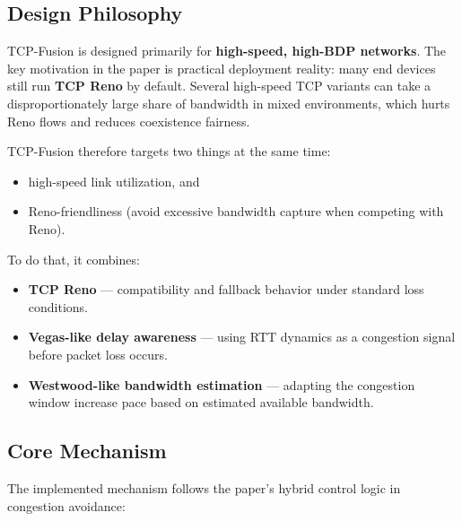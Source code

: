 \documentclass[12pt,a4paper]{article}
\begin{document}
\subsection{Design Philosophy}

TCP-Fusion is designed primarily for \textbf{high-speed, high-BDP networks}. The key motivation in the paper is practical deployment reality: many end devices still run \textbf{TCP Reno} by default. Several high-speed TCP variants can take a disproportionately large share of bandwidth in mixed environments, which hurts Reno flows and reduces coexistence fairness.

TCP-Fusion therefore targets two things at the same time:
\begin{itemize}
    \item high-speed link utilization, and
    \item Reno-friendliness (avoid excessive bandwidth capture when competing with Reno).
\end{itemize}

To do that, it combines:

\begin{itemize}
    \item \textbf{TCP Reno} --- compatibility and fallback behavior under standard loss conditions.
    \item \textbf{Vegas-like delay awareness} --- using RTT dynamics as a congestion signal before packet loss occurs.
    \item \textbf{Westwood-like bandwidth estimation} --- adapting the congestion window increase pace based on estimated available bandwidth.
\end{itemize}

\subsection{Core Mechanism}

The implemented mechanism follows the paper's hybrid control logic in congestion avoidance:
\end{document}
